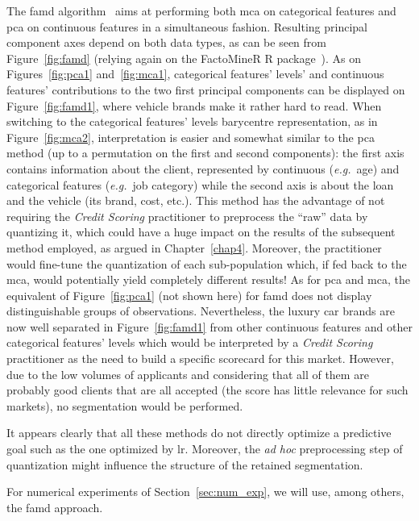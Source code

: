 The \gls{famd} algorithm~\cite{pages2014multiple} aims at performing both \gls{mca} on categorical features and \gls{pca} on continuous features in a simultaneous fashion. Resulting principal component axes depend on both data types, as can be seen from Figure~\ref{fig:famd} (relying again on the FactoMineR \textsc{R} package~\cite{JSSv025i01}). As on Figures~\ref{fig:pca1} and~\ref{fig:mca1}, categorical features' levels' and continuous features' contributions to the two first principal components can be displayed on Figure~\ref{fig:famd1}, where vehicle brands make it rather hard to read. When switching to the categorical features' levels barycentre representation, as in Figure~\ref{fig:mca2}, interpretation is easier and somewhat similar to the \gls{pca} method (up to a permutation on the first and second components): the first axis contains information about the client, represented by continuous (\textit{e.g.}\ age) and categorical features (\textit{e.g.}\ job category) while the second axis is about the loan and the vehicle (its brand, cost, etc.).
This method has the advantage of not requiring the \textit{Credit Scoring} practitioner to preprocess the ``raw'' data by quantizing it, which could have a huge impact on the results of the subsequent method employed, as argued in Chapter~\ref{chap4}. Moreover, the practitioner would fine-tune the quantization of each sub-population which, if fed back to the \gls{mca}, would potentially yield completely different results! As for \gls{pca} and \gls{mca}, the equivalent of Figure~\ref{fig:pca1} (not shown here) for \gls{famd} does not display distinguishable groups of observations. Nevertheless, the luxury car brands are now well separated in Figure~\ref{fig:famd1} from other continuous features and other categorical features' levels which would be interpreted by a \textit{Credit Scoring} practitioner as the need to build a specific scorecard for this market. However, due to the low volumes of applicants and considering that all of them are probably good clients that are all accepted (the score has little relevance for such markets), no segmentation would be performed.

\medskip

It appears clearly that all these methods do not directly optimize a predictive goal such as the one optimized by \gls{lr}. Moreover, the \textit{ad hoc} preprocessing step of quantization might influence the structure of the retained segmentation. 

For numerical experiments of Section~\ref{sec:num_exp}, we will use, among others, the \gls{famd} approach.

